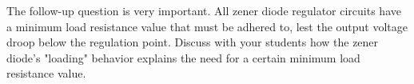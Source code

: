 The follow-up question is very important.  All zener diode regulator circuits have a minimum load resistance value that must be adhered to, lest the output voltage droop below the regulation point.  Discuss with your students how the zener diode's "loading" behavior explains the need for a certain minimum load resistance value.




